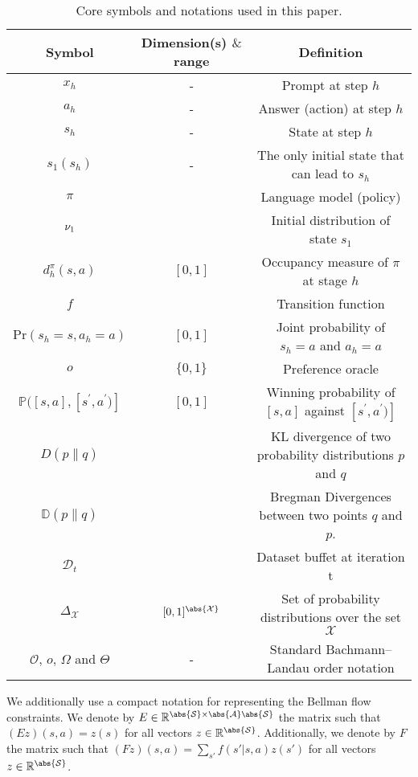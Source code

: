 \begin{table}[ht]
\caption{Core symbols and notations used in this paper.
}
\label{table:symbols_and_notations}
\small
\centering
\begin{tabular}{c | c | c}
\toprule
Symbol & Dimension(s) $\&$ range & Definition \\
\midrule
$x_h$ & - & Prompt at step $h$
\\
$a_h$ & - & Answer (action) at step $h$
\\
$s_h$ & - & State at step $h$ 
\\
$s_1(s_h)$ & - &  The only initial state that can lead to $s_h$
\\
$\pi$ &  & Language model (policy)
\\
$\nu_1$ &  & Initial distribution of state $s_1$
\\
 $d_h^\pi(s,a)$ & $[0,1]$ &  Occupancy measure of $\pi$ at stage $h$
\\
$f$ &  & Transition function  
\\
$\mathrm{Pr}(s_h=s,a_h=a)$ &  $[0,1]$ & Joint probability of $s_h=a$ and $a_h=a$
\\
$o$ &  $\{0,1\}$ & Preference oracle \\
$\mathbb{P}([s,a],[s^\prime,a^\prime)]$ & $[0,1]$ & Winning probability of $[s,a]$ against $[s^\prime,a^\prime)]$
\\
$D(p \| q)$ &  & KL divergence of two probability distributions $p$ and $q$ 
\\ 
$\mathbb{D}(p \| q)$ &  &
Bregman Divergences between two points $q$ and $p$.
\\
$\mathcal{D}_t$ &  & Dataset buffet at iteration t
\\
$\Delta_{\mathcal{X}}$ & $[0,1]^{\abs{\mathcal{X}}}$ & Set of probability distributions over the set $\mathcal{X}$
\\
\midrule
$\mathcal{O}$, $o$, $\Omega$ and $\Theta$ & - & Standard Bachmann–Landau order notation\\
\midrule
\end{tabular}
\end{table}
We additionally use a compact notation for representing the Bellman flow constraints. We denote by $E \in \mathbb{R}^{\abs{\mathcal{S}}\times\abs{\mathcal{A}}\abs{\mathcal{S}}}$ the matrix such that $(E z)(s, a) = z(s)$ for all vectors $z \in \mathbb{R}^{\abs{\mathcal{S}}}$. Additionally, we denote by $F$ the matrix such that $(F z)(s,a) = \sum_{s'}f(s'|s,a)z(s')$ for all vectors $z \in \mathbb{R}^{\abs{\mathcal{S}}}$.

